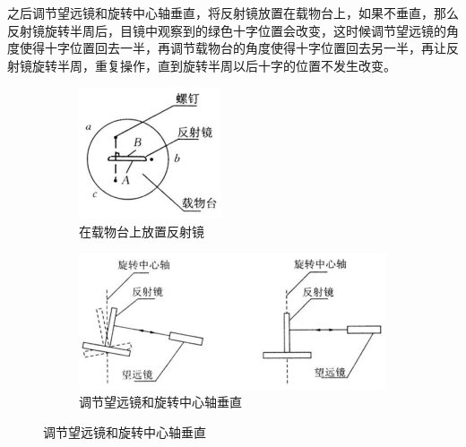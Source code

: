 \documentclass{ctexart}
\begin{document}
之后调节望远镜和旋转中心轴垂直，将反射镜放置在载物台上，如果不垂直，那么反射镜旋转半周后，目镜中观察到的绿色十字位置会改变，这时候调节望远镜的角度使得十字位置回去一半，再调节载物台的角度使得十字位置回去另一半，再让反射镜旋转半周，重复操作，直到旋转半周以后十字的位置不发生改变。

\begin{figure}[H]
  \centering
  \begin{subfigure}{.3\textwidth}
    \centering
    \includegraphics[width=\linewidth]{figures/在载物台上放置反射镜}
    \caption{在载物台上放置反射镜}
  \end{subfigure}
  \begin{subfigure}{.6\textwidth}
    \centering
    \includegraphics[width=\linewidth]{figures/调节望远镜和旋转中心轴垂直}
    \caption{调节望远镜和旋转中心轴垂直}
  \end{subfigure}
\end{figure}
\end{document}
